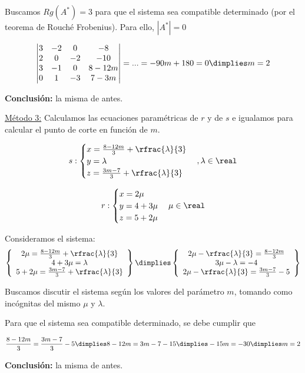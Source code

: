\documentclass[palatino,nosec,nochap,nobuilddate]{Docencia}
\begin{document}
\begin{problem}
Buscamos $Rg(A^*) = 3$ para que el sistema sea compatible determinado (por el teorema de Rouché Frobenius). Para ello, $|A^*| = 0$

\[
\left|\begin{matrix}
	3&-2&0&-8\\
	2&0&-2&-10\\
	3&-1&0&8-12m\\
	0&1&-3&7-3m
\end{matrix}\right| = ... = -90m+180 = 0 \dimplies m=2
\]

\textbf{Conclusión:} la misma de antes.

\ul{Método 3:} Calculamos las ecuaciones paramétricas de $r$ y de $s$ e igualamos para calcular el punto de corte en función de $m$.

\[
	s: \begin{cases}
	x = \frac{8-12m}{3} + \rfrac{\lambda}{3}\\
	y = \lambda \\
	z = \frac{3m-7}{3} + \rfrac{\lambda}{3}
	\end{cases}, \lambda\in\real
\]

\[
r:\begin{cases} 
x = 2\mu\\
y = 4+3\mu\\
z = 5+2\mu
\end{cases}\mu\in\real
\]

Consideramos el sistema:
\[\left\{
\begin{array}{c}
	2\mu = \frac{8-12m}{3} + \rfrac{\lambda}{3}\\
	4+3\mu = \lambda \\
	5+2\mu = \frac{3m-7}{3} + \rfrac{\lambda}{3}
\end{array}\right\} \dimplies \left\{
\begin{array}{c}
	2\mu-\rfrac{\lambda}{3} = \frac{8-12m}{3}\\
	3\mu-\lambda = -4\\
	2\mu-\rfrac{\lambda}{3} = \frac{3m-7}{3}-5
\end{array}\right\}
\]

Buscamos discutir el sistema según los valores del parámetro $m$, tomando como incógnitas del mismo $\mu$ y $\lambda$.

Para que el sistema sea compatible determinado, se debe cumplir que 

\[
\frac{8-12m}{3} = \frac{3m-7}{3}-5 \dimplies 8-12m = 3m-7-15 \dimplies -15m=-30 \dimplies m=2
\]

\textbf{Conclusión:} la misma de antes.


\end{problem}
\end{document}
